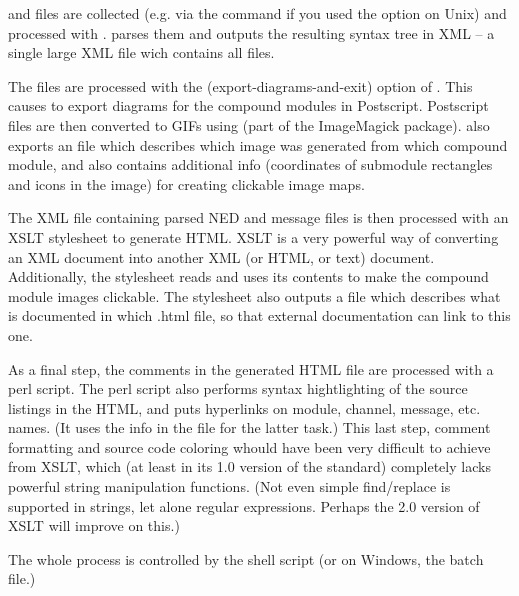  and  files are collected (e.g. via the 
command if you used the  option on Unix) and processed
with .  parses them and outputs the resulting syntax
tree in XML -- a single large XML file wich contains all files.

The  files are processed with the  (export-diagrams-and-exit)
option of . This causes  to export diagrams for the
compound modules in Postscript. Postscript files are then converted
to GIFs using  (part of the ImageMagick package).
 also exports an  file which describes which
image was generated from which compound module, and also contains
additional info (coordinates of submodule rectangles and icons in the image)
for creating clickable image maps.

The XML file containing parsed NED and message files is then processed
with an XSLT stylesheet to generate HTML. XSLT is a very powerful way
of converting an XML document into another XML (or HTML, or text) document.
Additionally, the stylesheet reads  and uses its contents
to make the compound module images clickable.
The stylesheet also outputs a  file which describes what is documented
in which .html file, so that external documentation can link to this one.

As a final step, the comments in the generated HTML file are processed
with a perl script. The perl script also performs syntax hightlighting
of the source listings in the HTML, and puts hyperlinks on module,
channel, message, etc. names. (It uses the info in the  file
for the latter task.) This last step, comment formatting and source code
coloring whould have been very difficult to achieve from XSLT, which
(at least in its 1.0 version of the standard) completely lacks powerful
string manipulation functions. (Not even simple find/replace
is supported in strings, let alone regular expressions. Perhaps the
2.0 version of XSLT will improve on this.)

The whole process is controlled by the  shell script
(or on Windows, the  batch file.)





